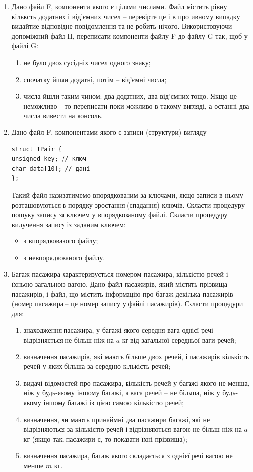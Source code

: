 \documentclass[a5paper,titlepage,openany,twoside,draft]{book_unv}%
\makeatletter
\newcommand{\xslalph}[1]{\expandafter\@xslalph\csname c@#1\endcsname}
\newcommand{\@xslalph}[1]{%
    \ifcase#1\or а\or б\or в\or г\or д\or e\or є\or ж\or з\or i%
    \or й\or к\or л\or м\or н\or о\or п\or р\or с\or т%
    \or у\or ф\or х\or ц\or ч\or ш\or ю\or я\or аа\or бб\or вв%
    \else\@ctrerr\fi%
}
\makeatother
\begin{document}
\begin{enumerate}
\item
  Дано файл F, компоненти якого є цілими числами. Файл містить рівну
кільксть додатних і від'ємних чисел -- перевірте це і в противному
  випадку видайтие відповідне повідомлення та не робить нічого.
  Використовуючи допоміжний файл H, переписати компоненти файлу F до
  файлу G так, щоб у файлі G:
\begin{enumerate}[label=\xslalph*)]
\item
не було двох сусідніх чисел одного знаку;
\item
спочатку йшли додатні, потім -- від'ємні числа;
\item
числа йшли таким чином: два додатних, два від'ємних тощо. Якщо це
неможливо -- то переписати поки можливо в такому вигляді, а останні два
числа вивести на консоль.
\end{enumerate}

\item
  Дано файл F, компонентами якого є записи (структури) вигляду
\begin{verbatim}
struct TPair {
unsigned key; // ключ
char data[10]; // дані
};
\end{verbatim}

Такий файл називатимемо впорядкованим за ключами, якщо записи в ньому
розташовуються в порядку зростання (спадання) ключів. Скласти процедуру
пошуку запису за ключем у впорядкованому файлі. Скласти процедуру
вилучення запису із заданим ключем:
\begin{itemize}
\item з впорядкованого файлу;
\item з невпорядкованого файлу.
\end{itemize}

\item
  Багаж пасажира характеризується номером пасажира, кількістю речей і
  їхньою загальною вагою. Дано файл пасажирів, який містить прізвища
  пасажирів, і файл, що містить інформацію про багаж декілька пасажирів
  (номер пасажира -- це номер запису у файлі пасажирів). 
Скласти процедури для:
  \begin{enumerate}[label=\xslalph*)]
\item
знаходження пасажира, у багажі якого середня вага однієї речі
відрізняється не більш ніж на $a$ кг від загальної середньої ваги речей;
\item
визначення пасажирів, які мають більше двох речей, і пасажирів
кількість речей у яких більша за середню кількість речей;
\item
видачі відомостей про пасажира, кількість речей у багажі якого не
менша, ніж у будь-якому іншому багажі, а вага речей -- не більша, ніж у
будь-якому іншому багажі із цією самою кількістю речей;
\item
визначення, чи мають принаймні два пасажири багажі, які не
відрізняються за кількістю речей і відрізняються вагою не більш ніж на $a$
кг (якщо такі пасажири є, то показати їхні прізвища);
\item визначення пасажира, багаж якого складається з однієї речі вагою не
менше $m$ кг.
  \end{enumerate}


\end{enumerate}
\end{document}
